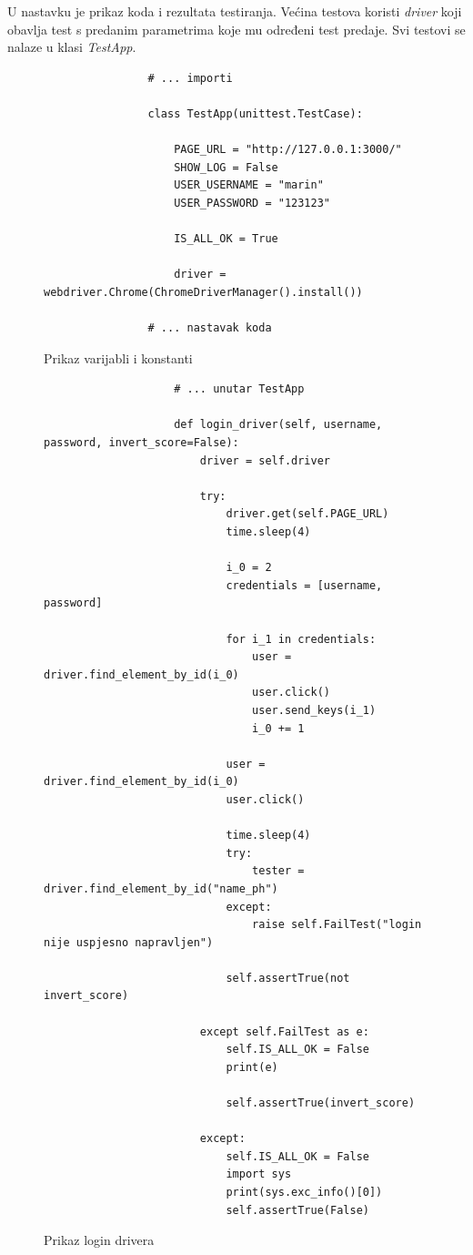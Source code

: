 			U nastavku je prikaz koda i rezultata testiranja.
			Većina testova koristi \textit{driver} koji obavlja test s predanim parametrima koje mu određeni test predaje.
			Svi testovi se nalaze u klasi \textit{TestApp}.
			
			\begin{figure}[H]
				\begin{lstlisting}
				# ... importi
				
				class TestApp(unittest.TestCase):
				
					PAGE_URL = "http://127.0.0.1:3000/"
					SHOW_LOG = False
					USER_USERNAME = "marin"
					USER_PASSWORD = "123123"
					
					IS_ALL_OK = True
					
					driver = webdriver.Chrome(ChromeDriverManager().install())
					
				# ... nastavak koda
				\end{lstlisting}
		
				\centering
				\caption{Prikaz varijabli i konstanti}
				\label{fig:test - sistemski- varijable i konstante}
			\end{figure}
		
					
			\begin{figure}[H]
				
				\begin{lstlisting}
					# ... unutar TestApp
					
					def login_driver(self, username, password, invert_score=False):
						driver = self.driver
						
						try:
							driver.get(self.PAGE_URL)
							time.sleep(4)
							
							i_0 = 2
							credentials = [username, password]
							
							for i_1 in credentials:
								user = driver.find_element_by_id(i_0)
								user.click()
								user.send_keys(i_1)
								i_0 += 1
							
							user = driver.find_element_by_id(i_0)
							user.click()
							
							time.sleep(4)
							try:
								tester = driver.find_element_by_id("name_ph")
							except:
								raise self.FailTest("login nije uspjesno napravljen")
								
							self.assertTrue(not invert_score)
							
						except self.FailTest as e:
							self.IS_ALL_OK = False
							print(e)
							
							self.assertTrue(invert_score)
							
						except:
							self.IS_ALL_OK = False
							import sys
							print(sys.exc_info()[0])
							self.assertTrue(False)
				\end{lstlisting}
				
				\centering
				\caption{Prikaz login drivera}
				\label{fig:test - sistemski - login driver}
			\end{figure}

